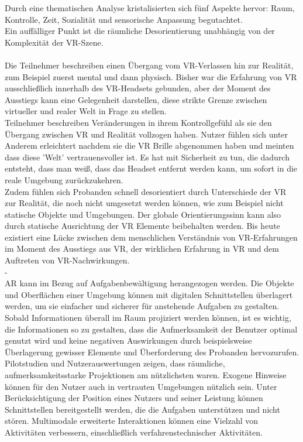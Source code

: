 Durch eine thematischen Analyse kristalisierten sich fünf Aspekte hervor: Raum, Kontrolle, Zeit, Sozialität und sensorische Anpassung begutachtet.\\
Ein auffälliger Punkt ist die räumliche Desorientierung unabhängig von der Komplexität der VR-Szene.\\ \\
 Die Teilnehmer beschreiben einen Übergang vom VR-Verlassen hin zur Realität, zum Beispiel zuerst mental und dann physisch.
Bisher war die Erfahrung von VR ausschließlich innerhalb des VR-Headsets gebunden, aber der Moment des Ausstiegs kann eine Gelegenheit darstellen, diese strikte Grenze zwischen virtueller und realer Welt in Frage zu stellen.\\
Teilnehmer beschreiben Veränderungen in ihrem Kontrollgefühl als sie den Übergang zwischen VR und Realität vollzogen haben. Nutzer fühlen sich unter Anderem erleichtert nachdem sie die VR Brille abgenommen haben und meinten dass diese 'Welt' vertrauensvoller ist. Es hat mit Sicherheit zu tun, die dadurch entsteht, dass man weiß, dass das Headset entfernt werden kann, um sofort in die reale Umgebung zurückzukehren.\\
Zudem fühlen sich Probanden schnell desorientiert durch Unterschiede der VR zur Realität, die noch nicht umgesetzt werden können, wie zum Beispiel nicht statische Objekte und Umgebungen. Der globale Orientierungssinn kann also durch statische Ausrichtung der VR Elemente beibehalten werden.
Bis heute existiert eine Lücke zwischen dem menschlichen Verständnis von VR-Erfahrungen im Moment des Ausstiegs aus VR, der wirklichen Erfahrung in VR und dem Auftreten von VR-Nachwirkungen. \cite{knibbe2018dream}\\


-\cite{bonanni2005attention}\\
AR kann im Bezug auf Aufgabenbewältigung herangezogen werden. 
Die Objekte und Oberflächen einer Umgebung können mit digitalen Schnittstellen überlagert werden, um sie einfacher und sicherer für anstehende Aufgaben zu gestalten. Sobald Informationen überall im Raum projiziert werden können, ist es wichtig, die Informationen so zu gestalten, dass die Aufmerksamkeit der Benutzer optimal genutzt wird und keine negativen Auswirkungen durch beispielsweise Überlagerung gewisser Elemente und Überforderung des Probanden hervozurufen. Pilotstudien und Nutzerauswertungen zeigen, dass räumliche, aufmerksamkeitsstarke Projektionen am nützlichsten waren. Exogene Hinweise können für den Nutzer auch in vertrauten Umgebungen nützlich sein. Unter Berücksichtigung der Position eines Nutzers und seiner Leistung können Schnittstellen bereitgestellt werden, die die Aufgaben unterstützen und nicht stören. Multimodale erweiterte Interaktionen können eine Vielzahl von Aktivitäten verbessern, einschließlich verfahrenstechnischer Aktivitäten.
